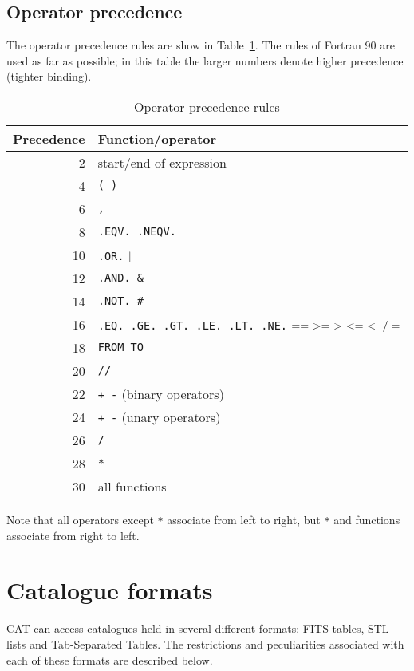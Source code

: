 \subsection{Operator precedence}

The operator precedence rules are show in Table~\ref{PREC}. The rules
of Fortran 90 are used as far as possible; in this table the larger
numbers denote higher precedence (tighter binding).

\begin{table}[htbp]

\begin{center}
\begin{tabular}{rl}
Precedence  & Function/operator  \\ \hline
  2 & start/end of expression  \\
  4 & {\tt (  )}  \\
  6 & {\tt ,}  \\
  8 & {\tt .EQV.  .NEQV.}  \\
 10 & {\tt  .OR.}   ${\tt |}$  \\
 12 & {\tt .AND.  \&} \\
 14 & {\tt .NOT.  \#}  \\
 16 & {\tt .EQ. .GE. .GT. .LE. .LT. .NE.} ${\tt == ~ >= ~ > ~ <= ~ < ~ /=}$ \\
 18 & {\tt FROM  TO}  \\
 20 & {\tt  //}  \\
 22 & {\tt  + -} (binary operators)  \\
 24 & {\tt  + -} (unary operators)  \\
 26 & {\tt  * /}  \\
 28 & {\tt  **}  \\
 30 & all functions  \\
\end{tabular}
\end{center}

\caption{\label{PREC}Operator precedence rules}

\end{table}


Note that all operators except {\tt **} associate from left to right, but
{\tt **} and functions associate from right to left.


\newpage
\section{\label{FORMAT}Catalogue formats}

CAT can access catalogues held in several different formats: FITS tables,
STL lists and Tab-Separated Tables.  The restrictions and peculiarities
associated with each of these formats are described below.

